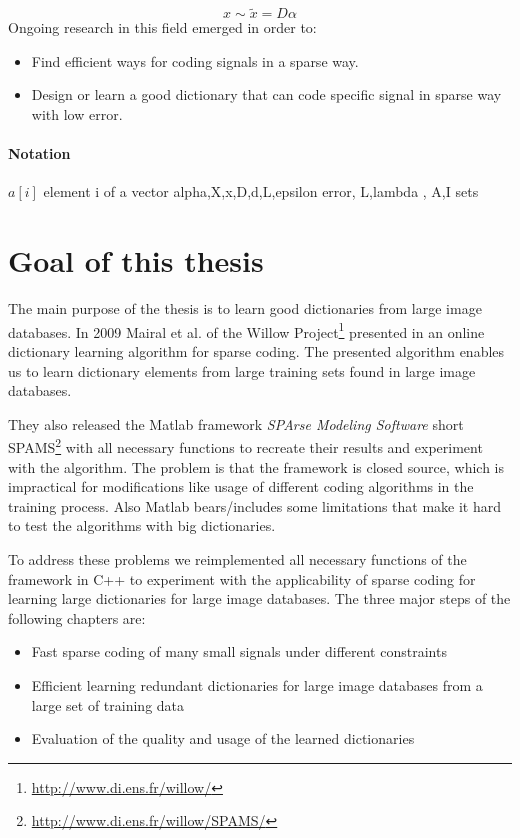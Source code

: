 \begin{equation}
 x \sim \tilde{x} = D\alpha
\end{equation}
Ongoing research in this field emerged in order to:
\begin{itemize}
 \item Find efficient ways for coding signals in a sparse way.
 \item Design or learn a good dictionary that can code specific signal in sparse
way with low error.
\end{itemize}



\paragraph{Notation}
$a[i]$ element i of a vector
alpha,X,x,D,d,L,epsilon error, L,lambda , A,I sets

\section{Goal of this thesis}
The main purpose of the thesis is to learn good dictionaries from large
image databases. %
In 2009 Mairal et al. of the Willow
Project\footnote{\url{http://www.di.ens.fr/willow/}} presented in
\cite{Mairal2009,Mairal2010} an online dictionary learning algorithm for sparse
coding. The presented algorithm enables us to learn dictionary elements from
large training sets found in large image databases.

They also released the Matlab framework \emph{SPArse Modeling Software}
short SPAMS\footnote{\url{http://www.di.ens.fr/willow/SPAMS/}} with all
necessary functions to recreate their results and experiment with the algorithm.
The problem is that the framework is closed source, which is impractical for
modifications like usage of different coding algorithms in the training process.
Also Matlab bears/includes some limitations that make it hard to test the
algorithms with big dictionaries.

To address these problems we reimplemented all necessary functions of the
framework in C++ to experiment with the applicability of sparse coding for
learning large dictionaries for large image databases. The three major steps of
the following chapters are:

\begin{itemize}
 \item Fast sparse coding of many small signals under different constraints
 \item Efficient learning redundant dictionaries for large image databases from
a large set of training data
 \item Evaluation of the quality and usage of the learned dictionaries
\end{itemize}

